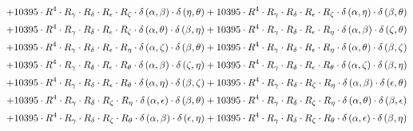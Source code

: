 \begin{subequations}
\begin{gather}
 \\[0.2em] \notag 		 + 10395 \cdot R^{4} \cdot R_{\gamma{}} \cdot R_{\delta{}} \cdot R_{\epsilon{}} \cdot R_{\zeta{}} \cdot \delta{}\left(\alpha{}, \beta{}\right) \cdot \delta{}\left(\eta{}, \theta{}\right)+ 10395 \cdot R^{4} \cdot R_{\gamma{}} \cdot R_{\delta{}} \cdot R_{\epsilon{}} \cdot R_{\zeta{}} \cdot \delta{}\left(\alpha{}, \eta{}\right) \cdot \delta{}\left(\beta{}, \theta{}\right) 
 \\[0.2em] \notag 		 + 10395 \cdot R^{4} \cdot R_{\gamma{}} \cdot R_{\delta{}} \cdot R_{\epsilon{}} \cdot R_{\zeta{}} \cdot \delta{}\left(\alpha{}, \theta{}\right) \cdot \delta{}\left(\beta{}, \eta{}\right)+ 10395 \cdot R^{4} \cdot R_{\gamma{}} \cdot R_{\delta{}} \cdot R_{\epsilon{}} \cdot R_{\eta{}} \cdot \delta{}\left(\alpha{}, \beta{}\right) \cdot \delta{}\left(\zeta{}, \theta{}\right) 
 \\[0.2em] \notag 		 + 10395 \cdot R^{4} \cdot R_{\gamma{}} \cdot R_{\delta{}} \cdot R_{\epsilon{}} \cdot R_{\eta{}} \cdot \delta{}\left(\alpha{}, \zeta{}\right) \cdot \delta{}\left(\beta{}, \theta{}\right)+ 10395 \cdot R^{4} \cdot R_{\gamma{}} \cdot R_{\delta{}} \cdot R_{\epsilon{}} \cdot R_{\eta{}} \cdot \delta{}\left(\alpha{}, \theta{}\right) \cdot \delta{}\left(\beta{}, \zeta{}\right) 
 \\[0.2em] \notag 		 + 10395 \cdot R^{4} \cdot R_{\gamma{}} \cdot R_{\delta{}} \cdot R_{\epsilon{}} \cdot R_{\theta{}} \cdot \delta{}\left(\alpha{}, \beta{}\right) \cdot \delta{}\left(\zeta{}, \eta{}\right)+ 10395 \cdot R^{4} \cdot R_{\gamma{}} \cdot R_{\delta{}} \cdot R_{\epsilon{}} \cdot R_{\theta{}} \cdot \delta{}\left(\alpha{}, \zeta{}\right) \cdot \delta{}\left(\beta{}, \eta{}\right) 
 \\[0.2em] \notag 		 + 10395 \cdot R^{4} \cdot R_{\gamma{}} \cdot R_{\delta{}} \cdot R_{\epsilon{}} \cdot R_{\theta{}} \cdot \delta{}\left(\alpha{}, \eta{}\right) \cdot \delta{}\left(\beta{}, \zeta{}\right)+ 10395 \cdot R^{4} \cdot R_{\gamma{}} \cdot R_{\delta{}} \cdot R_{\zeta{}} \cdot R_{\eta{}} \cdot \delta{}\left(\alpha{}, \beta{}\right) \cdot \delta{}\left(\epsilon{}, \theta{}\right) 
 \\[0.2em] \notag 		 + 10395 \cdot R^{4} \cdot R_{\gamma{}} \cdot R_{\delta{}} \cdot R_{\zeta{}} \cdot R_{\eta{}} \cdot \delta{}\left(\alpha{}, \epsilon{}\right) \cdot \delta{}\left(\beta{}, \theta{}\right)+ 10395 \cdot R^{4} \cdot R_{\gamma{}} \cdot R_{\delta{}} \cdot R_{\zeta{}} \cdot R_{\eta{}} \cdot \delta{}\left(\alpha{}, \theta{}\right) \cdot \delta{}\left(\beta{}, \epsilon{}\right) 
 \\[0.2em] \notag 		 + 10395 \cdot R^{4} \cdot R_{\gamma{}} \cdot R_{\delta{}} \cdot R_{\zeta{}} \cdot R_{\theta{}} \cdot \delta{}\left(\alpha{}, \beta{}\right) \cdot \delta{}\left(\epsilon{}, \eta{}\right)+ 10395 \cdot R^{4} \cdot R_{\gamma{}} \cdot R_{\delta{}} \cdot R_{\zeta{}} \cdot R_{\theta{}} \cdot \delta{}\left(\alpha{}, \epsilon{}\right) \cdot \delta{}\left(\beta{}, \eta{}\right) 

\end{gather}
\end{subequations}
